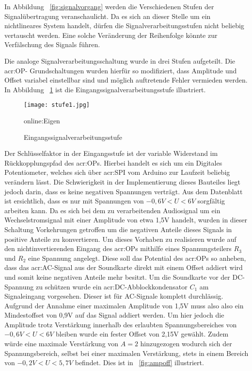 In Abbildung ~\ref{fig:signalvorgang} werden die Verschiedenen Stufen der Signalübertragung veranschaulicht. Da es sich an dieser Stelle um ein nichtlineares System handelt, dürfen die Signalverarbeitungsstufen nicht beliebig vertauscht werden. Eine solche Veränderung der Reihenfolge könnte zur Verfälschung des Signals führen. 

Die analoge Signalverarbeitungsschaltung wurde in drei Stufen aufgeteilt. Die \gls{acr:OP}- Grundschaltungen wurden hierfür so modifiziert, dass Amplitude und Offset variabel einstellbar sind und möglich auftretende Fehler vermieden werden. In Abbildung ~\ref{fig:stufe1} ist die Eingangssignalverarbeitungsstufe illustriert. 

\begin{figure}[H]
	\centering
	\texttt{[image: stufe1.jpg]}
	\caption[Eingangssignalverarbeitungsstufe]{Eingangssignalverarbeitungsstufe} \gls{online:Eigen}
	\label{fig:stufe1}
\end{figure}

Der Schlüsselfaktor in der Eingangsstufe ist der variable Widerstand im Rückkopplungspfad des \gls{acr:OP}s. Hierbei handelt es sich um ein Digitales Potentiometer, welches sich über \gls{acr:SPI} vom Arduino zur Laufzeit beliebig verändern lässt. Die Schwierigkeit in der Implementierung dieses Bauteiles liegt jedoch darin, dass es keine negativen Spannungen verträgt. Aus dem Datenblatt ist ersichtlich, dass es nur mit Spannungen von $-0,6V<U<6V$ sorgfältig arbeiten kann. Da es sich bei dem zu verarbeitenden Audiosignal um ein Wechselstromsignal mit einer Amplitude von etwa 1,5V handelt, wurden in dieser Schaltung Vorkehrungen getroffen um die negativen Anteile dieses Signals in positive Anteile zu konvertieren. Um dieses Vorhaben zu realisieren wurde auf den nichtinvertierenden Eingang des \gls{acr:OP}s mithilfe eines Spannungsteilers $R_{3}$ und $R_{2}$ eine Spannung angelegt. Diese soll das Potential des \gls{acr:OP}s so anheben, dass das \gls{acr:AC}-Signal aus der Soundkarte direkt mit einem Offset addiert wird und somit keine negativen Anteile mehr besitzt. Um die Soundkarte vor der DC-Spannung zu schützen wurde ein \gls{acr:DC}-Abblockkondensator $C_{1}$ am Signaleingang vorgesehen. Dieser ist für AC-Signale komplett durchlässig. Aufgrund der Annahme einer maximalen Amplitude von 1,5V muss also also ein Mindestoffset von 0,9V auf das Signal addiert werden. Um hier jedoch die Amplitude trotz Verstärkung innerhalb des erlaubten Spannungsbereiches von $-0,6V<U<6V$ bleiben wurde ein fester Offset von 2,15V gewählt. Zudem würde eine maximale Verstärkung von $A=2$ hinzugezogen wodurch sich der Spannungsbereich, selbst bei einer maximalen Verstärkung, stets in einem Bereich von $-0,2V<U<5,7V$ befindet. Dies ist in ~\ref{fig:ampoff} illustriert. 

